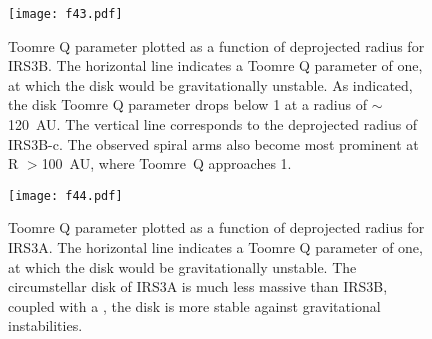 \documentclass[twocolumn, 12pt]{aastex63}
\newcommand{\ab}{$\sim$}
\begin{document}
\begin{figure}[H]
\begin{center}
\texttt{[image: f43.pdf]}
\end{center}   
\caption{Toomre Q parameter plotted as a function of deprojected radius for IRS3B. The horizontal line indicates a Toomre Q parameter of one, at which the disk would be gravitationally unstable. As indicated, the disk Toomre Q parameter drops below 1 at a radius of \ab120~AU. The vertical line corresponds to the deprojected radius of IRS3B-c. The observed spiral arms also become most prominent at R $>$100~AU, where Toomre~Q approaches 1.}\label{fig:irs3btoomreq}
\end{figure}

\begin{figure}[H]
\begin{center}
\texttt{[image: f44.pdf]}
\end{center}   
\caption{Toomre Q parameter plotted as a function of deprojected radius for IRS3A. The horizontal line indicates a Toomre Q parameter of one, at which the disk would be gravitationally unstable. The circumstellar disk of IRS3A is much less massive than IRS3B, coupled with a , the disk is more stable against gravitational instabilities.}\label{fig:irs3atoomreq}
\end{figure}
\end{document}
